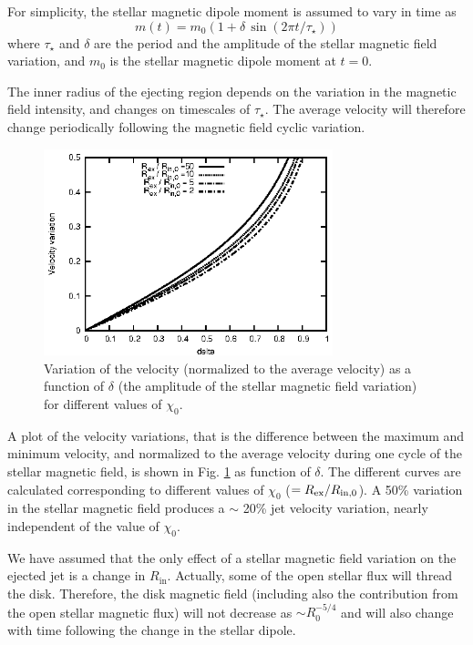 \documentclass{emulateapj}
\begin{document}
For simplicity, the stellar magnetic dipole moment
is assumed to vary in time as
\begin{equation}
  m(t) =  m_0 \left (1 + \delta \, \sin(2 \pi t/\tau_\star) \right)
  \label{eq:bvar}
\end{equation}
%
where $\tau_\star$ and $\delta$
are the period and the amplitude
of the stellar magnetic field variation, and $m_0$
is the stellar magnetic dipole moment at $t=0$.

The inner radius of the ejecting region depends on the
variation in the magnetic field intensity, and 
changes on timescales of $\tau_\star$.
The average velocity will therefore change periodically following the
magnetic field cyclic variation.

\begin{figure}
 \centering
 \includegraphics[width=84mm]{f3.eps}
  \caption{Variation of the velocity (normalized to the average velocity) 
           as a function of $\delta$ (the amplitude of the 
           stellar magnetic field variation) for different values of 
           $\chi_0$.}
  \label{fig3}
\end{figure}

A plot of the velocity variations, that is the difference between
the maximum and minimum velocity, and normalized to 
the average velocity during one cycle of the stellar magnetic field, 
is shown in Fig. \ref{fig3} as function of $\delta$.
The different curves are calculated corresponding to different values 
of $\chi_0$ ($=R_{\rm ex}/R_{\rm in,0}$).
A 50\% variation in the stellar magnetic field
produces a $\sim$ 20\% jet velocity variation,
nearly independent of the value of $\chi_0$.



We have assumed that the only effect  
of a stellar magnetic field variation on the ejected jet is  
a change in $R_\mathrm{in}$.
Actually, some of the open stellar flux will thread the disk.
Therefore, the disk magnetic field (including also the contribution
from the open stellar magnetic flux) will not decrease 
as $\sim R_0^{-5/4}$ and will also change with time
following the change in the stellar dipole.
\end{document}
